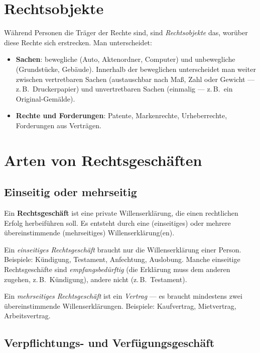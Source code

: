 \documentclass[11pt, a4paper]{article}
\begin{document}
\section{Rechtsobjekte}

Während Personen die Träger der Rechte sind, sind \emph{Rechtsobjekte} das, worüber
diese Rechte sich erstrecken. Man unterscheidet:

\begin{itemize}[itemsep=0pt]
  \item \textbf{Sachen}: bewegliche (Auto, Aktenordner, Computer) und unbewegliche (Grundstücke, Gebäude). Innerhalb der beweglichen unterscheidet man weiter zwischen vertretbaren Sachen (austauschbar nach Maß, Zahl oder Gewicht --- z.\,B.\ Druckerpapier) und unvertretbaren Sachen (einmalig --- z.\,B.\ ein Original-Gemälde).
  \item \textbf{Rechte und Forderungen}: Patente, Markenrechte, Urheberrechte, Forderungen aus Verträgen.
\end{itemize}

\section{Arten von Rechtsgeschäften}

\subsection{Einseitig oder mehrseitig}

\begin{merksatz}
Ein \textbf{Rechtsgeschäft} ist eine private Willenserklärung, die einen rechtlichen
Erfolg herbeiführen soll. Es entsteht durch eine (einseitiges) oder mehrere übereinstimmende
(mehrseitiges) Willenserklärung(en).
\end{merksatz}

Ein \emph{einseitiges Rechtsgeschäft} braucht nur die Willenserklärung einer Person.
Beispiele: Kündigung, Testament, Anfechtung, Auslobung. Manche einseitige Rechtsgeschäfte
sind \emph{empfangs­bedürftig} (die Erklärung muss dem anderen zugehen, z.\,B.\ Kündigung),
andere nicht (z.\,B.\ Testament).

Ein \emph{mehrseitiges Rechtsgeschäft} ist ein \emph{Vertrag} --- es braucht mindestens
zwei übereinstimmende Willenserklärungen. Beispiele: Kaufvertrag, Mietvertrag,
Arbeitsvertrag.

\subsection{Verpflichtungs- und Verfügungsgeschäft}
\end{document}
